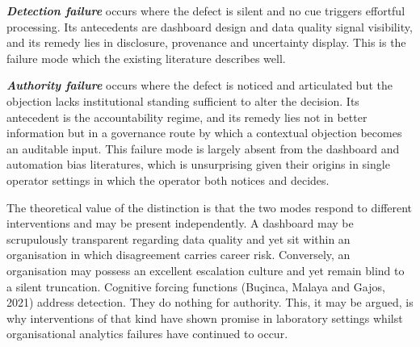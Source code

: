 \documentclass[12pt,a4paper]{article}
\begin{document}
\textbf{\emph{Detection failure}} occurs where the defect is silent and no cue triggers effortful
processing. Its antecedents are dashboard design and data quality signal visibility, and its remedy lies in
disclosure, provenance and uncertainty display. This is the failure mode which the existing literature
describes well.

\textbf{\emph{Authority failure}} occurs where the defect is noticed and articulated but the objection
lacks institutional standing sufficient to alter the decision. Its antecedent is the accountability regime,
and its remedy lies not in better information but in a governance route by which a contextual objection
becomes an auditable input. This failure mode is largely absent from the dashboard and automation bias
literatures, which is unsurprising given their origins in single operator settings in which the operator
both notices and decides.

The theoretical value of the distinction is that the two modes respond to different interventions
and may be present independently. A dashboard may be scrupulously transparent regarding data
quality and yet sit within an organisation in which disagreement carries career risk. Conversely,
an organisation may possess an excellent escalation culture and yet remain blind to a silent
truncation. Cognitive forcing functions (Buçinca, Malaya and Gajos, 2021) address detection. They
do nothing for authority. This, it may be argued, is why interventions of that kind have shown
promise in laboratory settings whilst organisational analytics failures have continued to occur.
\end{document}
